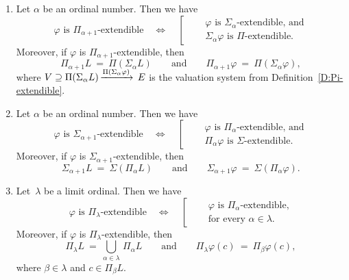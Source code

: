 \begin{dfn}
\begin{enumerate}
\item
Let $\alpha$ be an ordinal number.
Then we have
\begin{equation*}
\text{$\varphi$ is {$\Pi_{\alpha+1}$-extendible}}
\quad\iff\quad
\left[\quad
\begin{alignedat}{3}
&\varphi \text{ is $\Sigma_{\alpha}$-extendible, and}\\
&\Sigma_\alpha\varphi  \text{ is $\Pi$-extendible.}
\end{alignedat}
\right.
\end{equation*}
Moreover, if $\varphi$ is $\Pi_{\alpha+1}$-extendible,
then 
\begin{equation*}
\Pi_{\alpha+1} L \ =\  \Pi(\Sigma_\alpha L)\qquad\text{and}\qquad
\Pi_{\alpha+1} \varphi \ =\  \Pi(\Sigma_\alpha \varphi),
\end{equation*}
where 
 $V \supseteq \Pi(\Sigma_\alpha L)\,\smash{\xrightarrow{\Pi(\Sigma_\alpha\varphi)}\,E}$
is the valuation system from Definition~\ref{D:Pi-extendible}.

\item
Let $\alpha$ be an ordinal number.
Then we have
\begin{equation*}
\text{$\varphi$ is {$\Sigma_{\alpha+1}$-extendible}}
\quad\iff\quad
\left[\quad
\begin{alignedat}{3}
&\text{$\varphi$ is $\Pi_{\alpha}$-extendible, and}\\
&\text{$\Pi_\alpha \varphi$ is $\Sigma$-extendible.}
\end{alignedat}
\right.
\end{equation*}
Moreover,
if $\varphi$ is $\Sigma_{\alpha+1}$-extendible,
then 
\begin{equation*}
\Sigma_{\alpha+1} L \ =\  \Sigma(\Pi_\alpha L)\qquad\text{and}\qquad
\Sigma_{\alpha+1} \varphi \ =\  \Sigma(\Pi_\alpha \varphi).
\end{equation*}

\item
Let~$\lambda$ be a limit ordinal.
Then
we have 
\begin{equation*}
\text{$\varphi$ is {$\Pi_\lambda$-extendible}}
\quad\iff\quad
\left[\quad
\begin{alignedat}{3}
&\text{$\varphi$ is $\Pi_\alpha$-extendible,}\\
&\text{for every~$\alpha \in \lambda$}.
\end{alignedat}
\right.
\end{equation*}
Moreover,
if $\varphi$ is $\Pi_\lambda$-extendible,
then 
\begin{equation*}
\Pi_\lambda L \ =\  \textstyle{\bigcup_{\alpha \in \lambda}\, \Pi_\alpha L}
\qquad\text{and}\qquad
\Pi_\lambda \varphi (c) \ =\  \Pi_\beta \varphi(c),
\end{equation*}
where $\beta \in \lambda$ and $c\in \Pi_\beta L$.


\end{enumerate}
\end{dfn}
